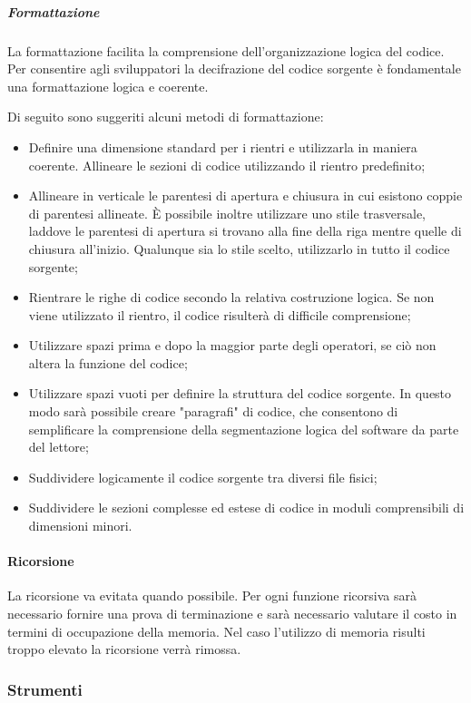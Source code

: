 \subparagraph{Formattazione}
La formattazione facilita la comprensione dell'organizzazione logica del codice. Per consentire agli sviluppatori la decifrazione del codice sorgente è fondamentale una formattazione logica e coerente.

Di seguito sono suggeriti alcuni metodi di formattazione:
\begin{itemize}
\item
Definire una dimensione standard per i rientri e utilizzarla in maniera coerente. Allineare le sezioni di codice utilizzando il rientro predefinito;
\item
Allineare in verticale le parentesi di apertura e chiusura in cui esistono coppie di parentesi allineate. È possibile inoltre utilizzare uno stile trasversale, laddove le parentesi di apertura si trovano alla fine della riga mentre quelle di chiusura all'inizio. Qualunque sia lo stile scelto, utilizzarlo in tutto il codice sorgente;
\item
Rientrare le righe di codice secondo la relativa costruzione logica. Se non viene utilizzato il rientro, il codice risulterà di difficile comprensione;
\item
Utilizzare spazi prima e dopo la maggior parte degli operatori, se ciò non altera la funzione del codice;
\item
Utilizzare spazi vuoti per definire la struttura del codice sorgente. In questo modo sarà possibile creare "paragrafi" di codice, che consentono di semplificare la comprensione della segmentazione logica del software da parte del lettore;
\item
Suddividere logicamente il codice sorgente tra diversi file fisici;
\item
Suddividere le sezioni complesse ed estese di codice in moduli comprensibili di dimensioni minori.
\end{itemize}

\paragraph{Ricorsione}
La ricorsione va evitata quando possibile. Per ogni funzione ricorsiva sarà necessario fornire una prova di terminazione e sarà necessario valutare il costo in termini di occupazione della memoria. Nel caso l'utilizzo di memoria risulti troppo elevato la ricorsione verrà rimossa.

\subsubsection{Strumenti}

